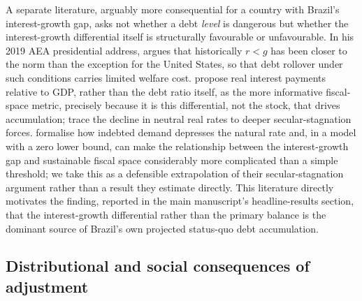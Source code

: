 \documentclass[11pt,a4paper]{article}
\begin{document}
A separate literature, arguably more consequential for a country with Brazil's interest-growth gap, asks not whether a debt \emph{level} is dangerous but whether the interest-growth differential itself is structurally favourable or unfavourable. In his 2019 AEA presidential address, \citet{blanchard2019} argues that historically $r<g$ has been closer to the norm than the exception for the United States, so that debt rollover under such conditions carries limited welfare cost. \citet{furmansummers2020} propose real interest payments relative to GDP, rather than the debt ratio itself, as the more informative fiscal-space metric, precisely because it is this differential, not the stock, that drives accumulation; \citet{rachelsummers2019} trace the decline in neutral real rates to deeper secular-stagnation forces. \citet{mianstraubsufi2021,mianstraubsufi2025} formalise how indebted demand depresses the natural rate and, in a model with a zero lower bound, can make the relationship between the interest-growth gap and sustainable fiscal space considerably more complicated than a simple threshold; we take this as a defensible extrapolation of their secular-stagnation argument rather than a result they estimate directly. This literature directly motivates the finding, reported in the main manuscript's headline-results section, that the interest-growth differential rather than the primary balance is the dominant source of Brazil's own projected status-quo debt accumulation.

\subsection{Distributional and social consequences of adjustment}
\label{sec:lit-distributional}
\end{document}
